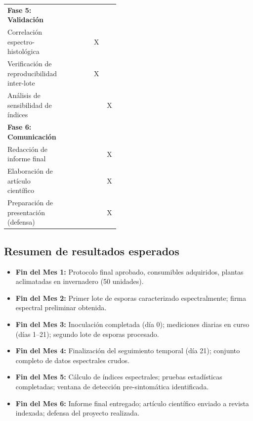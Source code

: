 \documentclass[12pt, a4paper]{article}
\begin{document}
\begin{table}
\begin{tabular}{p{0.45\linewidth} c c c c c c}
		\midrule
		\textbf{Fase 5: Validación} & & & & & & \\
		\quad Correlación espectro-histológica & & & & & X & \\
		\quad Verificación de reproducibilidad inter-lote & & & & & X & \\
		\quad Análisis de sensibilidad de índices & & & & & & X \\
		\midrule
		\textbf{Fase 6: Comunicación} & & & & & & \\
		\quad Redacción de informe final & & & & & & X \\
		\quad Elaboración de artículo científico & & & & & & X \\
		\quad Preparación de presentación (defensa) & & & & & & X \\
		\bottomrule
	\end{tabular}
\end{table}



\newpage
\subsection{Resumen de resultados esperados}
\begin{itemize}
	\item \textbf{Fin del Mes 1:} Protocolo final aprobado, consumibles adquiridos, plantas aclimatadas en invernadero (50 unidades).
	\item \textbf{Fin del Mes 2:} Primer lote de esporas caracterizado espectralmente; firma espectral preliminar obtenida.
	\item \textbf{Fin del Mes 3:} Inoculación completada (día 0); mediciones diarias en curso (días 1--21); segundo lote de esporas procesado.
	\item \textbf{Fin del Mes 4:} Finalización del seguimiento temporal (día 21); conjunto completo de datos espectrales crudos.
	\item \textbf{Fin del Mes 5:} Cálculo de índices espectrales; pruebas estadísticas completadas; ventana de detección pre-sintomática identificada.
	\item \textbf{Fin del Mes 6:} Informe final entregado; artículo científico enviado a revista indexada; defensa del proyecto realizada.
\end{itemize}
	

	\printbibliography[title={Referencias}]
	
\end{document}
